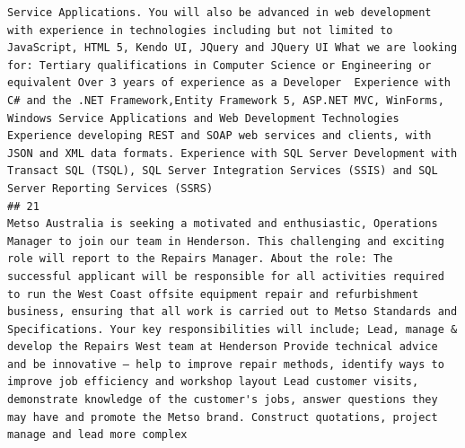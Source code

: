 \documentclass[11pt,a4paper,]{article}
\begin{document}
\begin{verbatim}
Service Applications. You will also be advanced in web development with experience in technologies including but not limited to JavaScript, HTML 5, Kendo UI, JQuery and JQuery UI What we are looking for: Tertiary qualifications in Computer Science or Engineering or equivalent Over 3 years of experience as a Developer  Experience with C# and the .NET Framework,Entity Framework 5, ASP.NET MVC, WinForms, Windows Service Applications and Web Development Technologies  Experience developing REST and SOAP web services and clients, with JSON and XML data formats. Experience with SQL Server Development with Transact SQL (TSQL), SQL Server Integration Services (SSIS) and SQL Server Reporting Services (SSRS)
## 21                                                                                                                                                                                                                                                                                                                                                                                                                                                                                                                                                                                                                                                                                                                                                                                                                                                                                                                                                                                                                                                                                                                                                                                                                                                                                                                                                                                                                                                                                                                                                                                                                                                                                                                                                                                                                                Metso Australia is seeking a motivated and enthusiastic, Operations Manager to join our team in Henderson. This challenging and exciting role will report to the Repairs Manager. About the role: The successful applicant will be responsible for all activities required to run the West Coast offsite equipment repair and refurbishment business, ensuring that all work is carried out to Metso Standards and Specifications. Your key responsibilities will include; Lead, manage & develop the Repairs West team at Henderson Provide technical advice and be innovative – help to improve repair methods, identify ways to improve job efficiency and workshop layout Lead customer visits, demonstrate knowledge of the customer's jobs, answer questions they may have and promote the Metso brand. Construct quotations, project manage and lead more complex 
\end{verbatim}
\end{document}
